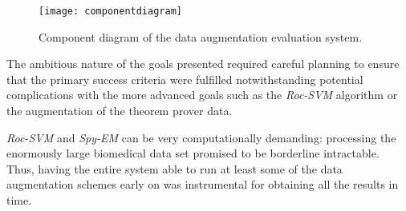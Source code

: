 \documentclass[12pt,twoside,notitlepage,amsart]{report} %
\begin{document}
	\begin{figure}%
	\texttt{[image: componentdiagram]}
	
	\caption{Component diagram of the data augmentation evaluation system.}%
	\end{figure}
	
	The ambitious nature of the goals presented required careful planning to ensure that the primary success criteria were fulfilled notwithstanding potential complications with the more advanced goals such as the \emph{Roc-SVM} algorithm or the augmentation of the theorem prover data. 
	
	
	
	\emph{Roc-SVM} and \emph{Spy-EM} can be very computationally demanding: processing the enormously large biomedical data set promised to be borderline intractable. Thus, having the entire system able to run at least some of the data augmentation schemes early on was instrumental for obtaining all the results in time.  
	
\end{document}
